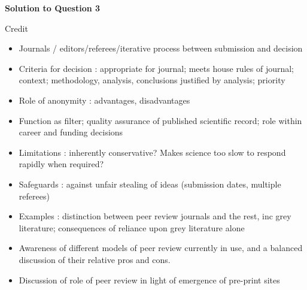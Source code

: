 \documentclass[a4paper,12pt,fleqn]{article}
\begin{document}
\textbf{Solution to Question 3}\newline

Credit
\begin{itemize}
\item Journals / editors/referees/iterative process between submission and decision
\item Criteria for decision : appropriate for journal; meets house rules of journal; context; methodology, analysis, conclusions justified by analysis; priority
\item Role of anonymity : advantages, disadvantages
\item Function as filter; quality assurance of published scientific record; role within career and funding decisions
\item Limitations : inherently conservative? Makes science too slow to respond rapidly when required?
\item Safeguards : against unfair stealing of ideas (submission dates, multiple referees)
\item Examples : distinction between peer review journals and the rest, inc grey literature; consequences of reliance upon grey literature alone
\item Awareness of different models of peer review currently in use, and a balanced discussion of their relative pros and cons.
\item Discussion of role of peer review in light of emergence of pre-print sites
\end{itemize}
\end{document}
